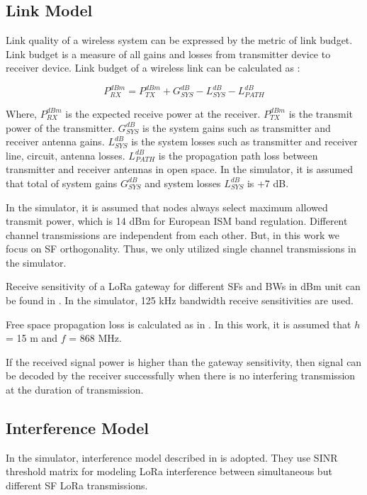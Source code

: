 \documentclass[conference]{IEEEtran}
\begin{document}
\subsection{Link Model}
\par Link quality of a wireless system can be expressed by the metric of link budget. Link budget is a measure of all gains and losses from transmitter device to receiver device. Link budget of a wireless link can be calculated as \cite{AN1200.22}:

\begin{equation} \label{eq:expected_rx_power}
P^{dBm}_{RX} = P^{dBm}_{TX} + G^{dB}_{SYS} - L^{dB}_{SYS} - L^{dB}_{PATH}
\end{equation}

\par Where, $P^{dBm}_{RX}$ is the expected receive power at the receiver. $P^{dBm}_{TX}$ is the transmit power of the transmitter. $G^{dB}_{SYS}$ is the system gains such as transmitter and receiver antenna gains. $L^{dB}_{SYS}$ is the system losses such as transmitter and receiver line, circuit, antenna losses. $L^{dB}_{PATH}$ is the propagation path loss between transmitter and receiver antennas in open space. In the simulator, it is assumed that total of system gains $G^{dB}_{SYS}$ and system losses $L^{dB}_{SYS}$ is +7 dB.

\par In the simulator, it is assumed that nodes always select maximum allowed transmit power, which is 14 dBm for European ISM band regulation. Different channel transmissions are independent from each other. But, in this work we focus on SF orthogonality. Thus, we only utilized single channel transmissions in the simulator.

\par Receive sensitivity of a LoRa gateway for different SFs and BWs in dBm unit can be found in \cite{SX1276}. In the simulator, 125 kHz bandwidth receive sensitivities are used.

\par Free space propagation loss is calculated as in \cite{TR136.942}. In this work, it is assumed that $h$ = 15 m and $f$ = 868 MHz.

\par If the received signal power is higher than the gateway sensitivity, then signal can be decoded by the receiver successfully when there is no interfering transmission at the duration of transmission.

\subsection{Interference Model}
\par In the simulator, interference model described in \cite{7996384} is adopted. They use SINR threshold matrix for modeling LoRa interference between simultaneous but different SF LoRa transmissions.
\end{document}
